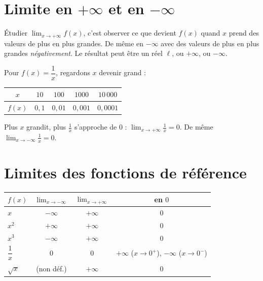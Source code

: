 \section{Limite en $+\infty$ et en $-\infty$}

\begin{aretenir}
Étudier $\displaystyle\lim_{x\to +\infty}f(x)$, c'est observer ce que devient $f(x)$
quand $x$ prend des valeurs de plus en plus grandes. De même en $-\infty$ avec des
valeurs de plus en plus grandes \emph{négativement}. Le résultat peut être un réel
$\ell$, ou $+\infty$, ou $-\infty$.
\end{aretenir}

\begin{exemple}
Pour $f(x)=\dfrac1x$, regardons $x$ devenir grand :
\begin{center}\renewcommand{\arraystretch}{1.25}
\begin{tabular}{@{}c|cccc@{}}
\toprule
$x$    & $10$  & $100$  & $1000$  & $10\,000$ \\
\midrule
$f(x)$ & $0{,}1$ & $0{,}01$ & $0{,}001$ & $0{,}0001$ \\
\bottomrule
\end{tabular}
\end{center}
Plus $x$ grandit, plus $\frac1x$ s'approche de $0$ : $\displaystyle\lim_{x\to +\infty}\frac1x=0$.
De même $\displaystyle\lim_{x\to -\infty}\frac1x=0$.
\end{exemple}

\section{Limites des fonctions de référence}

\begin{propriete}
\begin{center}\renewcommand{\arraystretch}{1.45}
\begin{tabular}{@{}l c c c@{}}
\toprule
$f(x)$ & $\displaystyle\lim_{x\to -\infty}$ & $\displaystyle\lim_{x\to +\infty}$ & en $0$ \\
\midrule
$x$        & $-\infty$ & $+\infty$ & $0$ \\
$x^2$      & $+\infty$ & $+\infty$ & $0$ \\
$x^3$      & $-\infty$ & $+\infty$ & $0$ \\
$\dfrac1x$ & $0$       & $0$       & $+\infty$ ($x\to0^+$), $-\infty$ ($x\to0^-$) \\
$\sqrt{x}$ & (non déf.)& $+\infty$ & $0$ \\
\bottomrule
\end{tabular}
\end{center}
\end{propriete}


